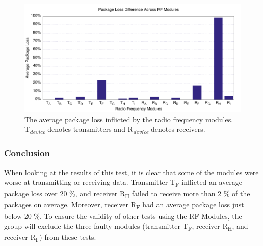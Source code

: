 \begin{figure}[H]
\centering
\includegraphics[width=\linewidth]{Figures/Graphs/diff_graph.pdf}
\centering
\caption{The average package loss inflicted by the radio frequency modules.\\ \textsf{T}\textsubscript{\textit{device}} denotes transmitters and \textsf{R}\textsubscript{\textit{device}} denotes receivers.}    
\label{fig:trans_diff}       
\end{figure} 

\subsubsection*{Conclusion}
When looking at the results of this test, it is clear that some of the modules were worse at transmitting or receiving data.
Transmitter \textsf{T\textsubscript{F}} inflicted an average package loss over 20 \%, and receiver \textsf{R\textsubscript{H}} failed to receive more than 2 \% of the packages on average.
Moreover, receiver \textsf{R\textsubscript{F}} had an average package loss just below 20 \%.
To ensure the validity of other tests using the RF Modules, the group will exclude the three faulty modules (transmitter \textsf{T\textsubscript{F}}, receiver \textsf{R\textsubscript{H}}, and receiver \textsf{R\textsubscript{F}}) from these tests.
